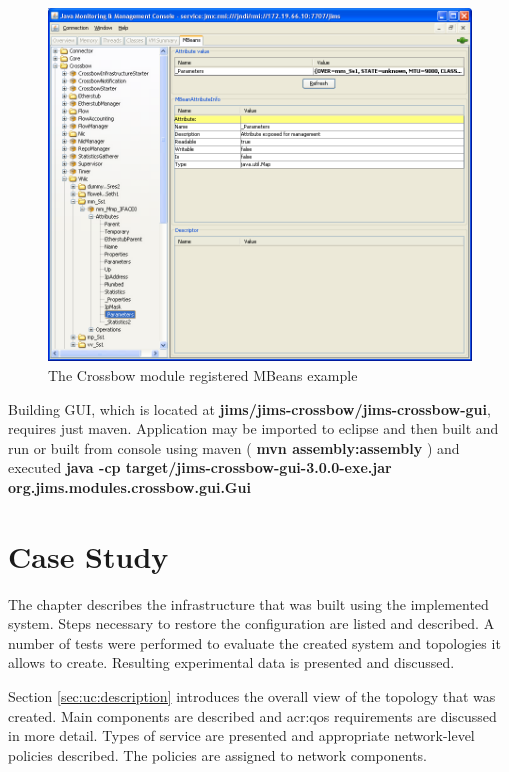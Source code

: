 \documentclass[11pt]{book}
\begin{document}
	  \begin{figure}[H]
        \begin{center}
            \includegraphics[width=1.0\textwidth]{img/impl/jconsole.png}
        \end{center}
        \caption{The Crossbow module registered MBeans example}
      \end{figure}
	  
	  Building GUI, which is located at \textbf{jims/jims-crossbow/jims-crossbow-gui}, requires just maven. Application may 
	  be imported to eclipse and then built and run or built from console using maven (\textbf{ mvn assembly:assembly })
	  and executed \textbf{java -cp target/jims-crossbow-gui-3.0.0-exe.jar org.jims.modules.crossbow.gui.Gui}


  \chapter{Case Study}
  \label{chap:cs}

    The chapter describes the infrastructure that was built using the implemented system. Steps necessary to restore the
    configuration are listed and described. A number of tests were performed to evaluate the created system and
    topologies it allows to create. Resulting experimental data is presented and discussed.

    Section \ref{sec:uc:description} introduces the overall view of the topology that was created. Main components are
    described and \gls{acr:qos} requirements are discussed in more detail. Types of service are presented and appropriate
    network-level policies described. The policies are assigned to network components.
\end{document}
